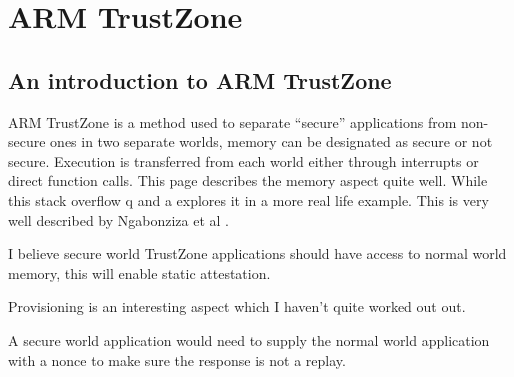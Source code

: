 \section{ARM TrustZone}

\subsection{An introduction to ARM TrustZone}

ARM TrustZone is a method used to separate “secure” applications from non-secure ones in two separate worlds, memory can be designated as secure or not secure. Execution is transferred from each world either through interrupts or direct function calls. This page describes the memory aspect quite well. While this stack overflow q and a explores it in a more real life example. This is very well described by Ngabonziza et al \cite{Ngabonziza2017}.

I believe secure world TrustZone applications should have access to normal world memory, this will enable static attestation.

Provisioning is an interesting aspect which I haven’t quite worked out out.

A secure world application would need to supply the normal world application with a nonce to make sure the response is not a replay.